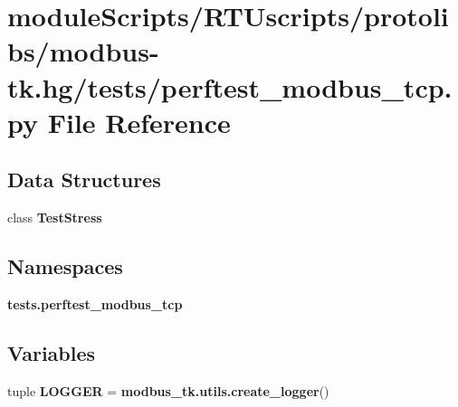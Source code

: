 \section{module\+Scripts/\+R\+T\+Uscripts/protolibs/modbus-\/tk.hg/tests/perftest\+\_\+modbus\+\_\+tcp.py File Reference}
\label{perftest__modbus__tcp_8py}
\subsection*{Data Structures}
\begin{DoxyCompactItemize}
\item 
class {\bf Test\+Stress}
\end{DoxyCompactItemize}
\subsection*{Namespaces}
\begin{DoxyCompactItemize}
\item 
 {\bf tests.\+perftest\+\_\+modbus\+\_\+tcp}
\end{DoxyCompactItemize}
\subsection*{Variables}
\begin{DoxyCompactItemize}
\item 
tuple {\bf L\+O\+G\+G\+E\+R} = {\bf modbus\+\_\+tk.\+utils.\+create\+\_\+logger}()
\end{DoxyCompactItemize}
